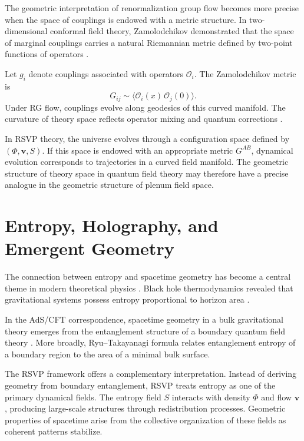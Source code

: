 \documentclass[12pt,a4paper]{article}
\theoremstyle{plain}
\theoremstyle{definition}
\theoremstyle{remark}
\begin{document}
The geometric interpretation of renormalization group flow becomes more
precise when the space of couplings is endowed with a metric structure.
In two-dimensional conformal field theory, Zamolodchikov demonstrated
that the space of marginal couplings carries a natural Riemannian metric
defined by two-point functions of operators \cite{Zamolodchikov1986}.

Let $g_i$ denote couplings associated with operators $\mathcal{O}_i$.
The Zamolodchikov metric is
\begin{equation}
G_{ij} \sim \langle \mathcal{O}_i(x)\,\mathcal{O}_j(0)\rangle.
\end{equation}
Under RG flow, couplings evolve along geodesics of this curved
manifold. The curvature of theory space reflects operator mixing and
quantum corrections \cite{PannellStergiou2025}.

In RSVP theory, the universe evolves through a configuration space
defined by $(\Phi,\mathbf{v},S)$. If this space is endowed with an
appropriate metric $G^{AB}$, dynamical evolution corresponds to
trajectories in a curved field manifold. The geometric structure of
theory space in quantum field theory may therefore have a precise
analogue in the geometric structure of plenum field space.

\section{Entropy, Holography, and Emergent Geometry}

The connection between entropy and spacetime geometry has become a
central theme in modern theoretical physics
\cite{tHooft1993,Susskind1995,Maldacena1998}. Black hole thermodynamics
revealed that gravitational systems possess entropy proportional to
horizon area \cite{Bekenstein1973,Hawking1975}.

In the AdS/CFT correspondence, spacetime geometry in a bulk gravitational
theory emerges from the entanglement structure of a boundary quantum
field theory \cite{Maldacena1998,RyuTakayanagi2006,Swingle2012}. More
broadly, Ryu--Takayanagi formula relates entanglement entropy of a
boundary region to the area of a minimal bulk surface.

The RSVP framework offers a complementary interpretation. Instead of
deriving geometry from boundary entanglement, RSVP treats entropy as
one of the primary dynamical fields. The entropy field $S$ interacts
with density $\Phi$ and flow $\mathbf{v}$, producing large-scale
structures through redistribution processes. Geometric properties of
spacetime arise from the collective organization of these fields as
coherent patterns stabilize.
\end{document}
